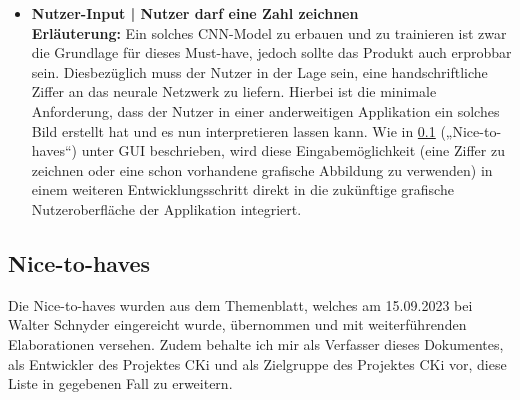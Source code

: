\begin{itemize}
	\item \textbf{Nutzer-Input | Nutzer darf eine Zahl zeichnen}
	\\
	\textbf{Erläuterung:}
	Ein solches CNN-Model zu erbauen und zu trainieren ist zwar die Grundlage für dieses Must-have, jedoch sollte das Produkt auch erprobbar sein. Diesbezüglich muss der Nutzer in der Lage sein, eine handschriftliche Ziffer an das neurale Netzwerk zu liefern. Hierbei ist die minimale Anforderung, dass der Nutzer in einer anderweitigen Applikation ein solches Bild erstellt hat und es nun interpretieren lassen kann. Wie in \ref{sec:AnalyseNiceToHaveS} („Nice-to-haves“) unter GUI beschrieben, wird diese Eingabemöglichkeit (eine Ziffer zu zeichnen oder eine schon vorhandene grafische Abbildung zu verwenden) in einem weiteren Entwicklungsschritt direkt in die zukünftige grafische Nutzeroberfläche der Applikation integriert.
	
\end{itemize}

\subsection{Nice-to-haves}
\label{sec:AnalyseNiceToHaveS}
Die Nice-to-haves wurden aus dem Themenblatt, welches am 15.09.2023 bei Walter Schnyder eingereicht wurde, übernommen und mit weiterführenden Elaborationen versehen. Zudem behalte ich mir als Verfasser dieses Dokumentes, als Entwickler des Projektes CKi und als Zielgruppe des Projektes CKi vor, diese Liste in gegebenen Fall zu erweitern.

